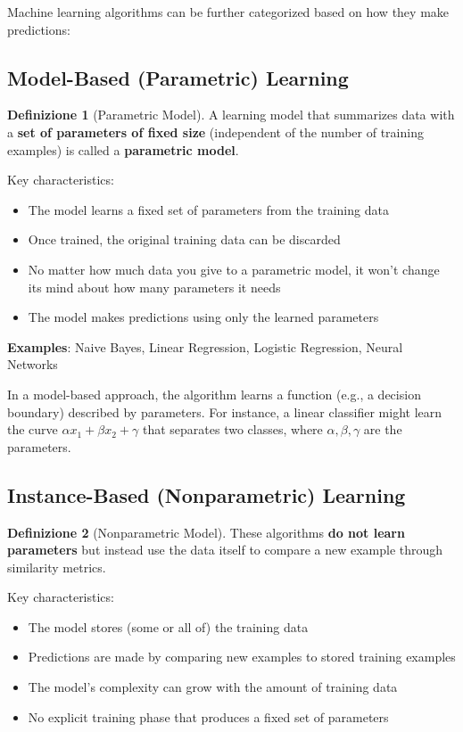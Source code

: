 \documentclass[11pt,a4paper]{article}
\theoremstyle{definition}
\newtheorem{definition}{Definizione}[section]
\theoremstyle{plain}
\theoremstyle{remark}
\begin{document}
Machine learning algorithms can be further categorized based on how they make predictions:

\subsection{Model-Based (Parametric) Learning}

\begin{definition}[Parametric Model]
A learning model that summarizes data with a \textbf{set of parameters of fixed size} (independent of the number of training examples) is called a \textbf{parametric model}.
\end{definition}

Key characteristics:
\begin{itemize}
    \item The model learns a fixed set of parameters from the training data
    \item Once trained, the original training data can be discarded
    \item No matter how much data you give to a parametric model, it won't change its mind about how many parameters it needs
    \item The model makes predictions using only the learned parameters
\end{itemize}

\textbf{Examples}: Naive Bayes, Linear Regression, Logistic Regression, Neural Networks

In a model-based approach, the algorithm learns a function (e.g., a decision boundary) described by parameters. For instance, a linear classifier might learn the curve $\alpha x_1 + \beta x_2 + \gamma$ that separates two classes, where $\alpha, \beta, \gamma$ are the parameters.

\subsection{Instance-Based (Nonparametric) Learning}

\begin{definition}[Nonparametric Model]
These algorithms \textbf{do not learn parameters} but instead use the data itself to compare a new example through similarity metrics.
\end{definition}

Key characteristics:
\begin{itemize}
    \item The model stores (some or all of) the training data
    \item Predictions are made by comparing new examples to stored training examples
    \item The model's complexity can grow with the amount of training data
    \item No explicit training phase that produces a fixed set of parameters
\end{itemize}
\end{document}
